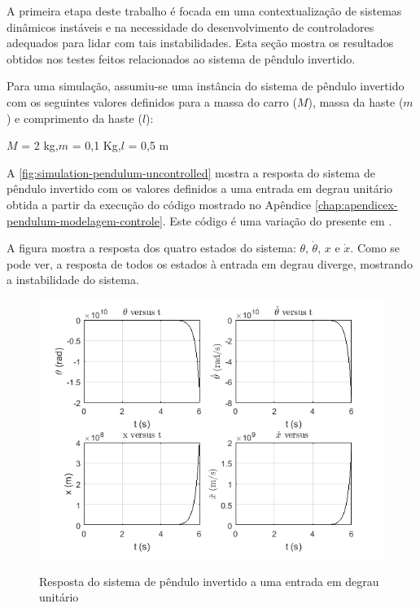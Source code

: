 A primeira etapa deste trabalho é focada em uma contextualização de sistemas dinâmicos instáveis e na necessidade do desenvolvimento de controladores adequados para lidar com tais instabilidades. Esta seção mostra os resultados obtidos nos testes feitos relacionados ao sistema de pêndulo invertido.

Para uma simulação, assumiu-se uma instância do sistema de pêndulo invertido com os seguintes valores definidos para a massa do carro ($M$), massa da haste ($m$) e comprimento da haste ($l$):
\begin{center}
$M$ = 2 kg,\quad$m$ = 0,1 Kg,\quad$l$ = 0,5 m
\end{center}

A \autoref{fig:simulation-pendulum-uncontrolled} mostra a resposta do sistema de pêndulo invertido com os valores definidos a uma entrada em degrau unitário obtida a partir da execução do código mostrado no Apêndice \ref{chap:apendicex-pendulum-modelagem-controle}. Este código é uma variação do presente em \cite[p.~750]{Ogata2010}.

A figura mostra a resposta dos quatro estados do sistema: $\theta$, $\dot{\theta}$, $x$ e $\dot{x}$. Como se pode ver, a resposta de todos os estados à entrada em degrau diverge, mostrando a instabilidade do sistema.

\begin{figure}[!htb]
    \centering
    \caption{Resposta do sistema de pêndulo invertido a uma entrada em degrau unitário}
    \includegraphics[width=1\textwidth]{./04-figuras/matlab_figuras_pendulo/sistema_sem_controle_estados_black}
    \label{fig:simulation-pendulum-uncontrolled}
\end{figure}

